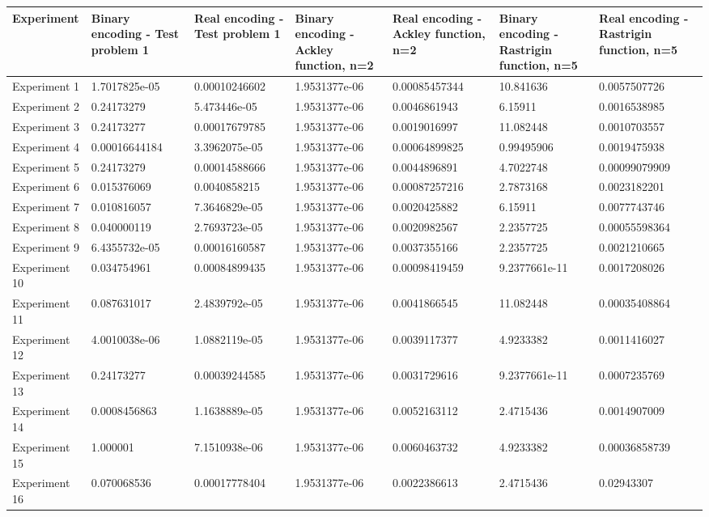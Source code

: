\begin{tabular}{lllllll}
\hline
Experiment & Binary encoding - Test problem 1 & Real encoding - Test problem 1 & Binary encoding - Ackley function, n=2 & Real encoding - Ackley function, n=2 & Binary encoding - Rastrigin function, n=5 & Real encoding - Rastrigin function, n=5 \\
\hline
Experiment 1 & 1.7017825e-05 & 0.00010246602 & 1.9531377e-06 & 0.00085457344 & 10.841636 & 0.0057507726 \\
Experiment 2 & 0.24173279 & 5.473446e-05 & 1.9531377e-06 & 0.0046861943 & 6.15911 & 0.0016538985 \\
Experiment 3 & 0.24173277 & 0.00017679785 & 1.9531377e-06 & 0.0019016997 & 11.082448 & 0.0010703557 \\
Experiment 4 & 0.00016644184 & 3.3962075e-05 & 1.9531377e-06 & 0.00064899825 & 0.99495906 & 0.0019475938 \\
Experiment 5 & 0.24173279 & 0.00014588666 & 1.9531377e-06 & 0.0044896891 & 4.7022748 & 0.00099079909 \\
Experiment 6 & 0.015376069 & 0.0040858215 & 1.9531377e-06 & 0.00087257216 & 2.7873168 & 0.0023182201 \\
Experiment 7 & 0.010816057 & 7.3646829e-05 & 1.9531377e-06 & 0.0020425882 & 6.15911 & 0.0077743746 \\
Experiment 8 & 0.040000119 & 2.7693723e-05 & 1.9531377e-06 & 0.0020982567 & 2.2357725 & 0.00055598364 \\
Experiment 9 & 6.4355732e-05 & 0.00016160587 & 1.9531377e-06 & 0.0037355166 & 2.2357725 & 0.0021210665 \\
Experiment 10 & 0.034754961 & 0.00084899435 & 1.9531377e-06 & 0.00098419459 & 9.2377661e-11 & 0.0017208026 \\
Experiment 11 & 0.087631017 & 2.4839792e-05 & 1.9531377e-06 & 0.0041866545 & 11.082448 & 0.00035408864 \\
Experiment 12 & 4.0010038e-06 & 1.0882119e-05 & 1.9531377e-06 & 0.0039117377 & 4.9233382 & 0.0011416027 \\
Experiment 13 & 0.24173277 & 0.00039244585 & 1.9531377e-06 & 0.0031729616 & 9.2377661e-11 & 0.0007235769 \\
Experiment 14 & 0.0008456863 & 1.1638889e-05 & 1.9531377e-06 & 0.0052163112 & 2.4715436 & 0.0014907009 \\
Experiment 15 & 1.000001 & 7.1510938e-06 & 1.9531377e-06 & 0.0060463732 & 4.9233382 & 0.00036858739 \\
Experiment 16 & 0.070068536 & 0.00017778404 & 1.9531377e-06 & 0.0022386613 & 2.4715436 & 0.02943307 \\

\end{tabular}
